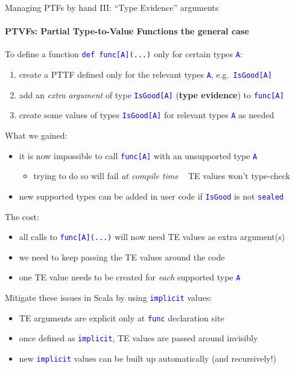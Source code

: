 \documentclass[english]{beamer}
\begin{document}
\begin{frame}{Managing PTFs by hand III: ``Type Evidence'' arguments}


\framesubtitle{PTVFs: Partial Type-to-Value Functions \textendash{} the general
case}

To define a function \texttt{\textcolor{blue}{\footnotesize{}def func{[}A{]}(...)}}
only for certain types \texttt{\textcolor{blue}{\footnotesize{}A}}:
\begin{enumerate}
\item create a PTTF defined only for the relevant types \texttt{\textcolor{blue}{\footnotesize{}A}},
e.g.\ \texttt{\textcolor{blue}{\footnotesize{}IsGood{[}A{]}}} \ 
\item add an \emph{extra argument} of type \texttt{\textcolor{blue}{\footnotesize{}IsGood{[}A{]}}}
(\textbf{type evidence}) to \texttt{\textcolor{blue}{\footnotesize{}func{[}A{]}}}\ 
\item create some values of types \texttt{\textcolor{blue}{\footnotesize{}IsGood{[}A{]}}}
for relevant types \texttt{\textcolor{blue}{\footnotesize{}A}} as
needed
\end{enumerate}
What we gained:
\begin{itemize}
\item it is now impossible to call \texttt{\textcolor{blue}{\footnotesize{}func{[}A{]}}}
with an unsupported type \texttt{\textcolor{blue}{\footnotesize{}A}}{\footnotesize \par}
\begin{itemize}
\item trying to do so will fail \emph{at compile time} \ \textendash{}
TE values won't type-check
\end{itemize}
\item new supported types can be added in user code if \texttt{\textcolor{blue}{\footnotesize{}IsGood}}
is not \texttt{\textcolor{blue}{\footnotesize{}sealed}}{\footnotesize \par}
\end{itemize}
The cost:
\begin{itemize}
\item all calls to \texttt{\textcolor{blue}{\footnotesize{}func{[}A{]}(...)}}
will now need TE values as extra argument(s)
\item we need to keep passing the TE values around the code
\item one TE value needs to be created for \emph{each} supported type \texttt{\textcolor{blue}{\footnotesize{}A}}
\ 
\end{itemize}
Mitigate these issues in Scala by using \texttt{\textcolor{blue}{\footnotesize{}implicit}}
values:
\begin{itemize}
\item TE arguments are explicit only at \texttt{\textcolor{blue}{\footnotesize{}func}}
declaration site
\item once defined as \texttt{\textcolor{blue}{\footnotesize{}implicit}},
TE values are passed around invisibly
\item new \texttt{\textcolor{blue}{\footnotesize{}implicit}} values can
be built up automatically (and recursively!)
\end{itemize}
\end{frame}
\end{document}
